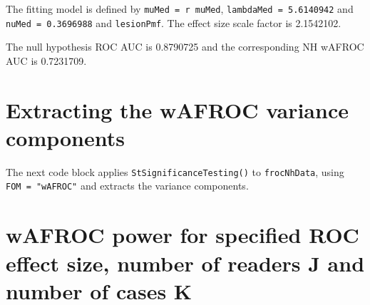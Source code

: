 \documentclass[]{book}
\newenvironment{Shaded}{\begin{snugshade}}{\end{snugshade}}
\newcommand{\DataTypeTok}[1]{\textcolor[rgb]{0.13,0.29,0.53}{#1}}
\newcommand{\KeywordTok}[1]{\textcolor[rgb]{0.13,0.29,0.53}{\textbf{#1}}}
\newcommand{\NormalTok}[1]{#1}
\newcommand{\OperatorTok}[1]{\textcolor[rgb]{0.81,0.36,0.00}{\textbf{#1}}}
\newcommand{\StringTok}[1]{\textcolor[rgb]{0.31,0.60,0.02}{#1}}
\begin{document}
The fitting model is defined by \texttt{muMed\ =\ r\ muMed}, \texttt{lambdaMed\ =\ 5.6140942} and \texttt{nuMed\ =\ 0.3696988} and \texttt{lesionPmf}. The effect size scale factor is 2.1542102.

\begin{Shaded}
\end{Shaded}

The null hypothesis ROC AUC is 0.8790725 and the corresponding NH wAFROC AUC is 0.7231709.

\hypertarget{extracting-the-wafroc-variance-components}{%
\section{Extracting the wAFROC variance components}\label{extracting-the-wafroc-variance-components}}

The next code block applies \texttt{StSignificanceTesting()} to \texttt{frocNhData}, using \texttt{FOM\ =\ "wAFROC"} and extracts the variance components.

\begin{Shaded}
\end{Shaded}

\hypertarget{wafroc-power-for-specified-roc-effect-size-number-of-readers-j-and-number-of-cases-k}{%
\section{wAFROC power for specified ROC effect size, number of readers J and number of cases K}\label{wafroc-power-for-specified-roc-effect-size-number-of-readers-j-and-number-of-cases-k}}
\end{document}
